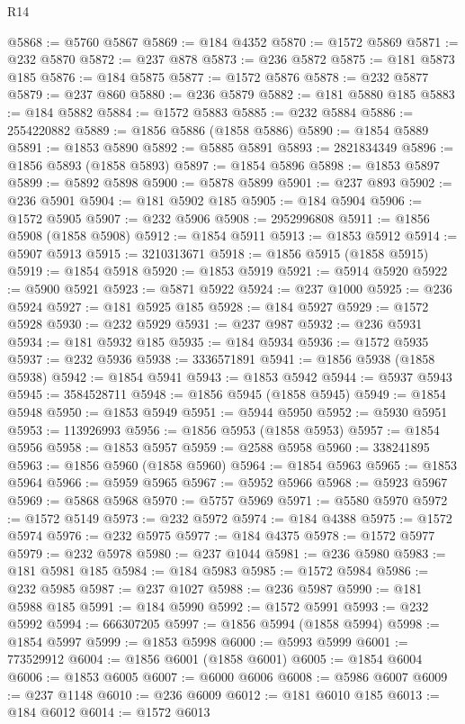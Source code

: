 \begin{lexlean}{R14}
\begin{coremodule}
@5868 := @5760 @5867
@5869 := @184 @4352
@5870 := @1572 @5869
@5871 := @232 @5870
@5872 := @237 @878
@5873 := @236 @5872
@5875 := @181 @5873 @185
@5876 := @184 @5875
@5877 := @1572 @5876
@5878 := @232 @5877
@5879 := @237 @860
@5880 := @236 @5879
@5882 := @181 @5880 @185
@5883 := @184 @5882
@5884 := @1572 @5883
@5885 := @232 @5884
@5886 := 2554220882
@5889 := @1856 @5886 (@1858 @5886)
@5890 := @1854 @5889
@5891 := @1853 @5890
@5892 := @5885 @5891
@5893 := 2821834349
@5896 := @1856 @5893 (@1858 @5893)
@5897 := @1854 @5896
@5898 := @1853 @5897
@5899 := @5892 @5898
@5900 := @5878 @5899
@5901 := @237 @893
@5902 := @236 @5901
@5904 := @181 @5902 @185
@5905 := @184 @5904
@5906 := @1572 @5905
@5907 := @232 @5906
@5908 := 2952996808
@5911 := @1856 @5908 (@1858 @5908)
@5912 := @1854 @5911
@5913 := @1853 @5912
@5914 := @5907 @5913
@5915 := 3210313671
@5918 := @1856 @5915 (@1858 @5915)
@5919 := @1854 @5918
@5920 := @1853 @5919
@5921 := @5914 @5920
@5922 := @5900 @5921
@5923 := @5871 @5922
@5924 := @237 @1000
@5925 := @236 @5924
@5927 := @181 @5925 @185
@5928 := @184 @5927
@5929 := @1572 @5928
@5930 := @232 @5929
@5931 := @237 @987
@5932 := @236 @5931
@5934 := @181 @5932 @185
@5935 := @184 @5934
@5936 := @1572 @5935
@5937 := @232 @5936
@5938 := 3336571891
@5941 := @1856 @5938 (@1858 @5938)
@5942 := @1854 @5941
@5943 := @1853 @5942
@5944 := @5937 @5943
@5945 := 3584528711
@5948 := @1856 @5945 (@1858 @5945)
@5949 := @1854 @5948
@5950 := @1853 @5949
@5951 := @5944 @5950
@5952 := @5930 @5951
@5953 := 113926993
@5956 := @1856 @5953 (@1858 @5953)
@5957 := @1854 @5956
@5958 := @1853 @5957
@5959 := @2588 @5958
@5960 := 338241895
@5963 := @1856 @5960 (@1858 @5960)
@5964 := @1854 @5963
@5965 := @1853 @5964
@5966 := @5959 @5965
@5967 := @5952 @5966
@5968 := @5923 @5967
@5969 := @5868 @5968
@5970 := @5757 @5969
@5971 := @5580 @5970
@5972 := @1572 @5149
@5973 := @232 @5972
@5974 := @184 @4388
@5975 := @1572 @5974
@5976 := @232 @5975
@5977 := @184 @4375
@5978 := @1572 @5977
@5979 := @232 @5978
@5980 := @237 @1044
@5981 := @236 @5980
@5983 := @181 @5981 @185
@5984 := @184 @5983
@5985 := @1572 @5984
@5986 := @232 @5985
@5987 := @237 @1027
@5988 := @236 @5987
@5990 := @181 @5988 @185
@5991 := @184 @5990
@5992 := @1572 @5991
@5993 := @232 @5992
@5994 := 666307205
@5997 := @1856 @5994 (@1858 @5994)
@5998 := @1854 @5997
@5999 := @1853 @5998
@6000 := @5993 @5999
@6001 := 773529912
@6004 := @1856 @6001 (@1858 @6001)
@6005 := @1854 @6004
@6006 := @1853 @6005
@6007 := @6000 @6006
@6008 := @5986 @6007
@6009 := @237 @1148
@6010 := @236 @6009
@6012 := @181 @6010 @185
@6013 := @184 @6012
@6014 := @1572 @6013

\end{coremodule}
\end{lexlean}
